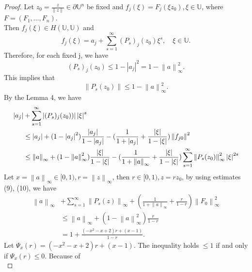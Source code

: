 \documentclass{birkjour}
\theoremstyle{plain}
\theoremstyle{definition}
\theoremstyle{definition}
\begin{document}
    \begin{proof}
	Let $z_0=\frac{z}{\left \| z \right \| } \in \partial \mathbb{U} ^n$ be fixed and $f_j(\xi )=F_j(\xi z_0),\xi \in \mathbb{U} $, where $F=(F_1,\dots ,F_n)$.\\
	Then $f_j(\xi )\in H(\mathbb{U},\mathbb{U} )$ and
	\begin{equation*}
		f_j(\xi )=a_j+\sum_{s=1}^{\infty} (P_s)_j(z_0)\xi ^s, \quad \xi \in \mathbb{U}.
	\end{equation*}
	Therefore, for each fixed j, we have
	\begin{equation*}
	(P_s)_j(z_0)\le 1-\left | a_j \right | ^2=1-\left \| a \right \| ^2_{\infty}.
	\end{equation*}
	This implies that
	\begin{equation}
		\left \| P_s(z_0) \right \| \le 1-\left \| a \right \| ^2_{\infty}.
	\end{equation}
	By the Lemma 4, we have
	\begin{align}
		\left | a_j \right | &+\sum_{s=1}^{\infty} \left | (P_s)_j(z_0)) \right | \left | \xi  \right | ^s \notag \\
		&\le \left | a_j \right | +(1-\left | a_j \right | ^2)\frac{\left | a_j \right | }{1-\left | a_j \right | } -(\frac{1}{1+\left | a_j \right | } +\frac{\left | \xi \right | }{1-\left | \xi \right |} )\left \| f_{j0} \right \| ^2 \notag \\
		&\le \left \| a \right \|_{\infty}  +(1-\left \| a \right \|_{\infty}  ^2)\frac{\left | \xi \right | }{1-\left | \xi \right | } -(\frac{1}{1+\left \| a \right \|_{\infty}  } +\frac{\left | \xi \right | }{1-\left | \xi \right |} )\sum_{s=1}^{\infty}\left \| P_s(z_0) \right \|_{\infty}^2\left | \xi \right |^{2s}
	\end{align}
	Let $x=\left \| a \right \|_{\infty}\in [0,1), r=\left \| z \right \|_{\infty}$, then $ r \in [0,1), z=rz_0$, by using estimates (9), (10), we have
	\begin{align*}
		\left \| a \right \|_{\infty}&+\sum_{s=1}^{\infty}\left \| P_s(z) \right \|_{\infty}+(\frac{1}{1+\left \| a \right \|_{\infty}} +\frac{r}{1-r}  )\left \| F_0 \right \|^2_{\infty} \\
		&\le \left \| a \right \|_{\infty}+(1-\left \| a \right \|_{\infty}^2)\frac{r}{1-r}\\
		&=1+\frac{(-x^2-x+2)r+(x-1)}{1-r}.
	\end{align*}
	Let $\Psi_x (r)=(-x^2-x+2)r+(x-1)$. The inequality holds $\le 1$ if and only if $\Psi_x (r) \le 0$. Because of
	\begin{equation*}

\end{equation*}
\end{proof}
\end{document}
